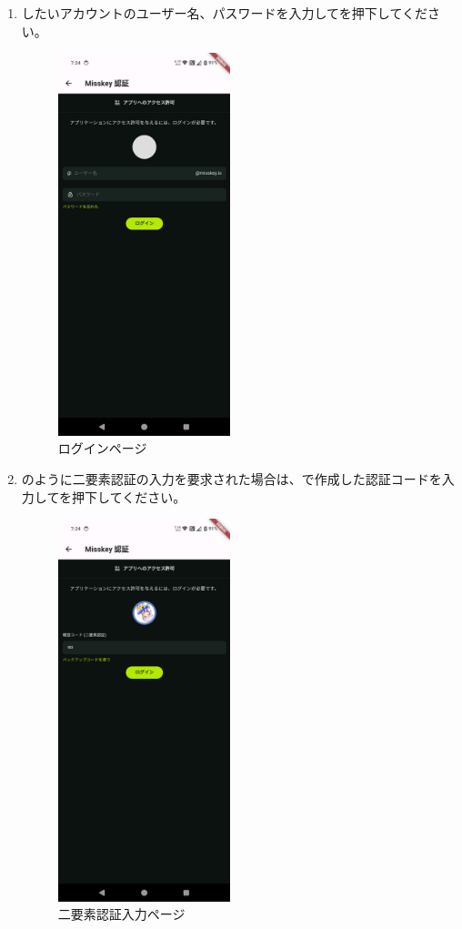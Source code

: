 \begin{enumerate}
                \newpage
                \item \nowplaying したい\mi アカウントのユーザー名、パスワードを入力してを押下してください。
                \label{item:misskey4}
                    \begin{figure}[htbp]
                        \centering
                        \includegraphics[width=5cm]{./pictures/misskey3.png}
                        \caption{ログインページ}
                        \label{img:misskey3}
                    \end{figure}

                \newpage
                \item {}のように二要素認証の入力を要求された場合は、で作成した認証コードを入力してを押下してください。
                    \begin{figure}[htbp]
                        \centering
                        \includegraphics[width=5cm]{./pictures/misskey4.png}
                        \caption{二要素認証入力ページ}
                        \label{img:misskey4}
                    \end{figure}


\end{enumerate}
